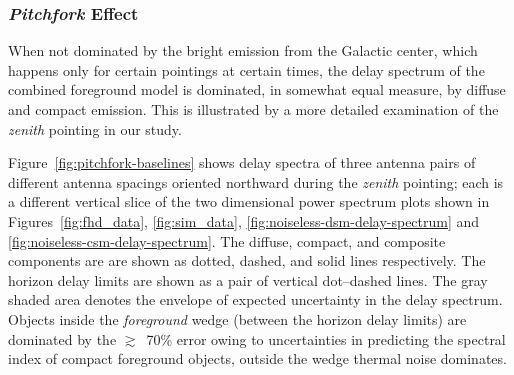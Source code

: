 \documentclass[preprint2,iop,numberedappendix]{emulateapj}
\begin{document}
\subsubsection{{\it Pitchfork} Effect}\label{sec:pitchfork}

When not dominated by the bright emission from the Galactic center, which happens only for certain pointings at certain times, the delay spectrum of the combined foreground model is dominated, in somewhat equal measure, by diffuse and compact emission. This is illustrated by a more detailed examination of the {\it zenith} pointing in our study. 

Figure~\ref{fig:pitchfork-baselines} shows delay spectra of three antenna pairs of different antenna spacings oriented northward during the {\it zenith} pointing; each is a different vertical slice of the two dimensional power spectrum plots shown in Figures~\ref{fig:fhd_data}, \ref{fig:sim_data}, \ref{fig:noiseless-dsm-delay-spectrum} and \ref{fig:noiseless-csm-delay-spectrum}. The diffuse, compact, and composite components are are shown as dotted, dashed, and solid lines respectively. The horizon delay limits are shown as a pair of vertical dot--dashed lines. The gray shaded area denotes the envelope of expected uncertainty in the delay spectrum. Objects inside the {\it foreground} wedge (between the horizon delay limits) are dominated by the $\gtrsim$~70\% error owing to uncertainties in predicting the spectral index of compact foreground objects, outside the wedge thermal noise dominates. 
\end{document}
